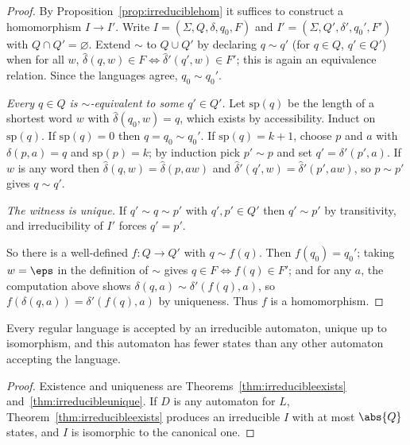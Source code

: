 \begin{proof}
	By Proposition~\ref{prop:irreduciblehom} it suffices to construct a homomorphism $I \to I'$. Write $I = (\Sigma, Q, \delta, q_0, F)$ and $I' = (\Sigma, Q', \delta', q_0', F')$ with $Q \cap Q' = \varnothing$. Extend $\sim$ to $Q \cup Q'$ by declaring $q \sim q'$ (for $q \in Q$, $q' \in Q'$) when for all $w$, $\hat\delta(q,w) \in F \iff \hat\delta'(q',w) \in F'$; this is again an equivalence relation. Since the languages agree, $q_0 \sim q_0'$.

	\emph{Every $q \in Q$ is $\sim$-equivalent to some $q' \in Q'$.} Let $\mathrm{sp}(q)$ be the length of a shortest word $w$ with $\hat\delta(q_0,w) = q$, which exists by accessibility. Induct on $\mathrm{sp}(q)$. If $\mathrm{sp}(q) = 0$ then $q = q_0 \sim q_0'$. If $\mathrm{sp}(q) = k+1$, choose $p$ and $a$ with $\delta(p,a) = q$ and $\mathrm{sp}(p) = k$; by induction pick $p' \sim p$ and set $q' = \delta'(p',a)$. If $w$ is any word then $\hat\delta(q,w) = \hat\delta(p,aw)$ and $\hat\delta'(q',w) = \hat\delta'(p',aw)$, so $p \sim p'$ gives $q \sim q'$.

	\emph{The witness is unique.} If $q' \sim q \sim p'$ with $q',p' \in Q'$ then $q' \sim p'$ by transitivity, and irreducibility of $I'$ forces $q' = p'$.

	So there is a well-defined $f \colon Q \to Q'$ with $q \sim f(q)$. Then $f(q_0) = q_0'$; taking $w = \eps$ in the definition of $\sim$ gives $q \in F \iff f(q) \in F'$; and for any $a$, the computation above shows $\delta(q,a) \sim \delta'(f(q),a)$, so $f(\delta(q,a)) = \delta'(f(q),a)$ by uniqueness. Thus $f$ is a homomorphism.
\end{proof}

\begin{corollary}
	Every regular language is accepted by an irreducible automaton, unique up to isomorphism, and this automaton has fewer states than any other automaton accepting the language.
\end{corollary}

\begin{proof}
	Existence and uniqueness are Theorems~\ref{thm:irreducibleexists} and~\ref{thm:irreducibleunique}. If $D$ is any automaton for $L$, Theorem~\ref{thm:irreducibleexists} produces an irreducible $I$ with at most $\abs{Q}$ states, and $I$ is isomorphic to the canonical one.
\end{proof}

